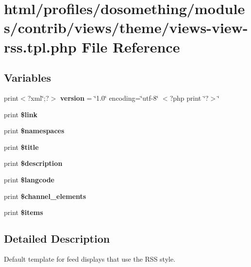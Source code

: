 \hypertarget{views-view-rss_8tpl_8php}{
\section{html/profiles/dosomething/modules/contrib/views/theme/views-\/view-\/rss.tpl.php File Reference}
\label{views-view-rss_8tpl_8php}
}
\subsection*{Variables}
\begin{DoxyCompactItemize}
\item 
\hypertarget{views-view-rss_8tpl_8php_a69dd99931bb815569a5a340a35b5b978}{
print$<$?xml\char`\"{};?$>$ {\bfseries version} = \char`\"{}1.0\char`\"{} encoding=\char`\"{}utf-\/8\char`\"{} $<$?php print \char`\"{}?$>$\char`\"{}}
\label{views-view-rss_8tpl_8php_a69dd99931bb815569a5a340a35b5b978}

\item 
\hypertarget{views-view-rss_8tpl_8php_aa6dcf0b94d1bbabe3406acb25a24f3f3}{
print {\bfseries \$link}}
\label{views-view-rss_8tpl_8php_aa6dcf0b94d1bbabe3406acb25a24f3f3}

\item 
\hypertarget{views-view-rss_8tpl_8php_adc02370abfe7f2f4e616d84f359041de}{
print {\bfseries \$namespaces}}
\label{views-view-rss_8tpl_8php_adc02370abfe7f2f4e616d84f359041de}

\item 
\hypertarget{views-view-rss_8tpl_8php_aec2795512d255332f57cacd930a090b4}{
print {\bfseries \$title}}
\label{views-view-rss_8tpl_8php_aec2795512d255332f57cacd930a090b4}

\item 
\hypertarget{views-view-rss_8tpl_8php_a6f52c29993b17bf2650a9337fb56d41d}{
print {\bfseries \$description}}
\label{views-view-rss_8tpl_8php_a6f52c29993b17bf2650a9337fb56d41d}

\item 
\hypertarget{views-view-rss_8tpl_8php_a3403807573a8f6376a368255ccbc8602}{
print {\bfseries \$langcode}}
\label{views-view-rss_8tpl_8php_a3403807573a8f6376a368255ccbc8602}

\item 
\hypertarget{views-view-rss_8tpl_8php_a98613013ad3494e1668b0d25eb37d9d9}{
print {\bfseries \$channel\_\-elements}}
\label{views-view-rss_8tpl_8php_a98613013ad3494e1668b0d25eb37d9d9}

\item 
\hypertarget{views-view-rss_8tpl_8php_a659f315cdf7f7836d272d803af1dda46}{
print {\bfseries \$items}}
\label{views-view-rss_8tpl_8php_a659f315cdf7f7836d272d803af1dda46}

\end{DoxyCompactItemize}


\subsection{Detailed Description}
Default template for feed displays that use the RSS style. 